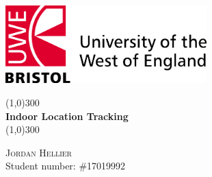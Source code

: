 \begin{titlepage}

		\includegraphics[height=3cm]{./images/uwe_logo.jpg}
		\vspace{25mm}

	\begin{center}
		\line(1,0){300}\\
		[5mm]
		\huge{\bfseries Indoor Location Tracking}\\
		[2mm]
		\line(1,0){300}\\
		[10cm]
	\end{center}
	
	\begin{flushright}
	\textsc{\Large Jordan Hellier}\\
	Student number: \#17019992
	\end{flushright}
\end{titlepage}